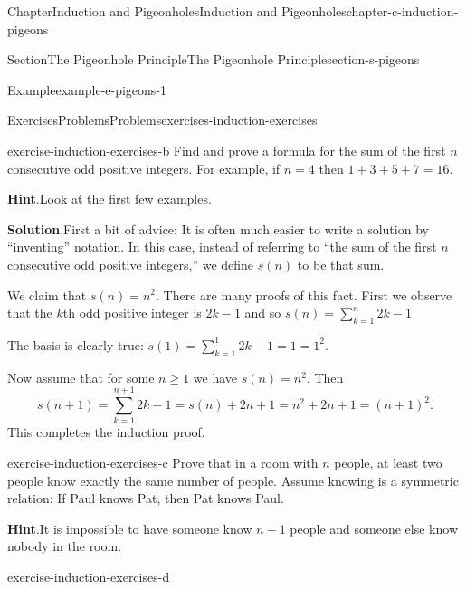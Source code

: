 \documentclass[oneside,10pt,]{book}
\newcommand{\blocktitlefont}{\relax}
\numberwithin{equation}{section}
\begin{document}
\begin{chapterptx}{Chapter}{Induction and Pigeonholes}{}{Induction and Pigeonholes}{}{}{chapter-c-induction-pigeons}
\begin{sectionptx}{Section}{The Pigeonhole Principle}{}{The Pigeonhole Principle}{}{}{section-s-pigeons}
\begin{example}{Example}{}{example-e-pigeons-1}
\end{example}
\end{sectionptx}
%
%
\typeout{************************************************}
\typeout{************************************************}
%
\begin{exercises-section}{Exercises}{Problems}{}{Problems}{}{}{exercises-induction-exercises}
\begin{divisionexercise}{1}{}{}{exercise-induction-exercises-b}%
Find and prove a formula for the sum of the first \(n\) consecutive odd positive integers. For example, if \(n = 4\) then \(1 + 3 + 5 + 7 = 16\).%
\par\smallskip%
\noindent\textbf{\blocktitlefont Hint}.\hypertarget{hint-induction-exercises-b-b}{}\quad{}Look at the first few examples.%
\par\smallskip%
\noindent\textbf{\blocktitlefont Solution}.\hypertarget{solution-induction-exercises-b-c}{}\quad{}First a bit of advice: It is often much easier to write a solution by ``inventing'' notation.  In this case, instead of referring to ``the sum of the first \(n\) consecutive odd positive integers,'' we define \(s(n)\) to be that sum.%
\par
We claim that \(s(n)=n^2\).  There are many proofs of this fact.  First we observe that the \(k\)th odd positive integer is \(2k-1\) and so \(s(n)=\sum_{k=1}^n 2k-1\)%
\par
The basis is clearly true:  \(s(1)=\sum_{k=1}^1 2k-1 = 1 = 1^2\).%
\par
Now assume that for some \(n\geq 1\) we have \(s(n)=n^2\).  Then%
\begin{equation*}
s(n+1) = \sum_{k=1}^{n+1} 2k-1= s(n) + 2n + 1 = n^2 + 2n +1 = (n+1)^2.
\end{equation*}
This completes the induction proof.%
\end{divisionexercise}%
\begin{divisionexercise}{2}{}{}{exercise-induction-exercises-c}%
Prove that in a room with \(n\) people, at least two people know exactly the same number of people. Assume knowing is a symmetric relation: If Paul knows Pat, then Pat knows Paul.%
\par\smallskip%
\noindent\textbf{\blocktitlefont Hint}.\hypertarget{hint-induction-exercises-c-b}{}\quad{}It is impossible to have someone know \(n-1\) people and someone else know nobody in the room.%
\end{divisionexercise}%
\begin{divisionexercise}{3}{}{}{exercise-induction-exercises-d}%

\end{divisionexercise}
\end{exercises-section}
\end{chapterptx}
\end{document}
